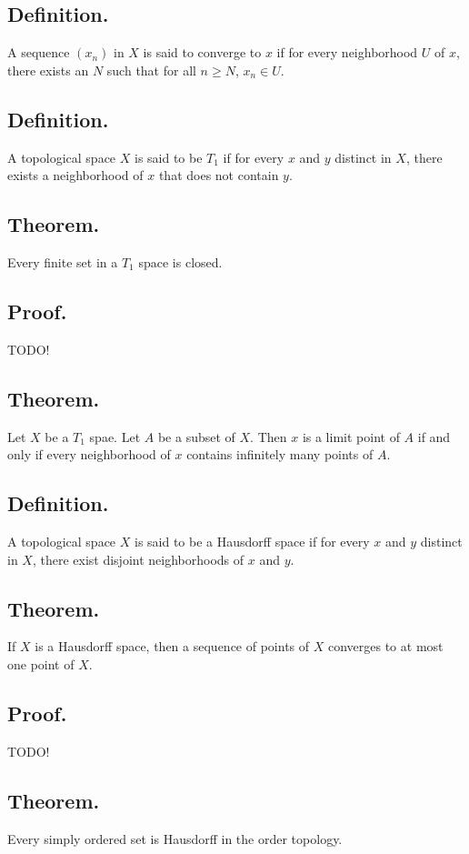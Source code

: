 \documentclass[titlepage]{article}
\begin{document}
\subsection{Definition.} A sequence $(x_{n})$ in $X$ is said to converge to $x$ if for every neighborhood $U$ of $x$, there exists an $N$ such that for all $n \geq N$, $x_{n} \in U$.

\subsection{Definition.} A topological space $X$ is said to be $T_{1}$ if for every $x$ and $y$ distinct in $X$, there exists a neighborhood of $x$ that does not contain $y$.

\subsection{Theorem.} Every finite set in a $T_{1}$ space is closed.

\subsection{Proof.} TODO!

\subsection{Theorem.} Let $X$ be a $T_{1}$ spae. Let $A$ be a subset of $X$. Then $x$ is a limit point of $A$ if and only if every neighborhood of $x$ contains infinitely many points of $A$.

\subsection{Definition.} A topological space $X$ is said to be a Hausdorff space if for every $x$ and $y$ distinct in $X$, there exist disjoint neighborhoods of $x$ and $y$.

\subsection{Theorem.} If $X$ is a Hausdorff space, then a sequence of points of $X$ converges to at most one point of $X$.

\subsection{Proof.} TODO!

\subsection{Theorem.} Every simply ordered set is Hausdorff in the order topology.
\end{document}
